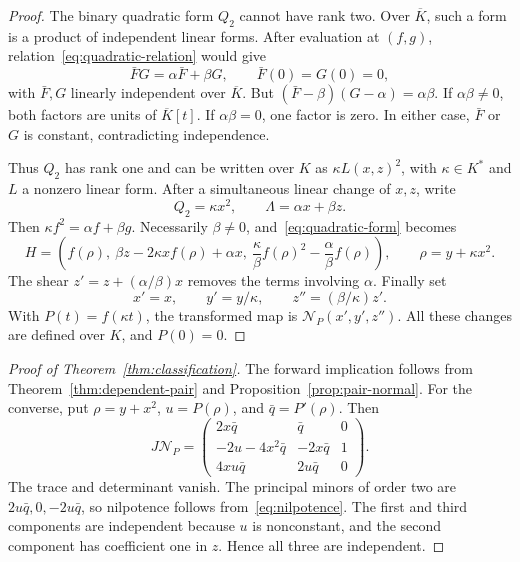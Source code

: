 \documentclass[11pt,reqno]{amsart}
\theoremstyle{definition}
\theoremstyle{remark}
\numberwithin{equation}{section}
\newcommand{\Ncal}{\mathcal N}
\begin{document}
\begin{proof}
The binary quadratic form $Q_2$ cannot have rank two. Over $\overline K$, such a form is a product of independent linear forms. After evaluation at $(f,g)$, relation~\eqref{eq:quadratic-relation} would give
\[
  \bar{F}G=\alpha \bar{F}+\beta G,\qquad \bar{F}(0)=G(0)=0,
\]
with $\bar{F},G$ linearly independent over $ \overline K$. But
$(\bar{F}-\beta)(G-\alpha)=\alpha\beta$. If $\alpha\beta\neq0$, both factors are units of $\overline K[t]$. If $\alpha\beta=0$, one factor is zero. In either case, $\bar{F}$ or $G$ is constant, contradicting independence.

Thus $Q_2$ has rank one and can be written over $K$ as $\kappa L(x,z)^2$, with $\kappa\in K^*$ and $L$ a nonzero linear form. After a simultaneous linear change of $x,z$, write
\[
 Q_2=\kappa x^2,\qquad \Lambda=\alpha x+\beta z.
\]
Then $\kappa f^2=\alpha f+\beta g$. Necessarily $\beta\neq0$, and~\eqref{eq:quadratic-form} becomes
\begin{equation}\label{eq:precanonical}
 H=\left(f(\rho),\ \beta z-2\kappa xf(\rho)+\alpha x,
 \ \frac{\kappa}{\beta}f(\rho)^2-\frac{\alpha}{\beta}f(\rho)\right),
 \qquad \rho=y+\kappa x^2.
\end{equation}
The shear $z'=z+(\alpha/\beta)x$ removes the terms involving $\alpha$. Finally set
\[
 x'=x,\qquad y'=y/\kappa,\qquad z''=(\beta/\kappa)z'.
\]
With $P(t)=f(\kappa t)$, the transformed map is $\Ncal_P(x',y',z'')$. All these changes are defined over $K$, and $P(0)=0$.
\end{proof}

\begin{proof}[Proof of Theorem~\ref{thm:classification}]
The forward implication follows from Theorem~\ref{thm:dependent-pair} and Proposition~\ref{prop:pair-normal}. For the converse, put $\rho=y+x^2$, $u=P(\rho)$, and $\bar{q}=P'(\rho)$. Then
\begin{equation}\label{eq:canonical-J}
 J\Ncal_P=
 \begin{pmatrix}
 2x\bar{q}&\bar{q}&0\\
 -2u-4x^2\bar{q}&-2x\bar{q}&1\\
 4xu\bar{q}&2u\bar{q}&0
 \end{pmatrix}.
\end{equation}
The trace and determinant vanish. The principal minors of order two are $2u\bar{q},0,-2u\bar{q}$, so nilpotence follows from~\eqref{eq:nilpotence}. The first and third components are independent because $u$ is nonconstant, and the second component has coefficient one in $z$. Hence all three are independent.
\end{proof}
\end{document}

